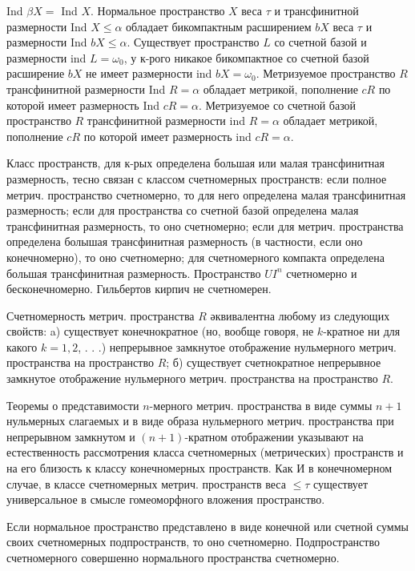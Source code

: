 \documentclass[10pt]{article}
\begin{document}
Ind $\beta X=$ Ind $X$. Нормальное пространство $X$ веса $\tau$ и трансфинитной размерности Ind $X \leqslant \alpha$ обладает бикомпактным расширением $b X$ веса $\tau$ и размерности Ind $b X \leqslant \alpha$. Существует пространство $L$ со счетной базой и размерности ind $L=\omega_{0}$, у к-рого никакое бикомпактное со счетной базой расширение $b X$ не имеет размерности ind $b X=\omega_{0}$. Метризуемое пространство $R$ трансфинитной размерности Ind $R=\alpha$ обладает метрикой, пополнение $c R$ по которой имеет размерность Ind $c R=\alpha$. Метризуемое со счетной базой пространство $R$ трансфинитной размерности ind $R=\alpha$ обладает метрикой, пополнение $c R$ по которой имеет размерность ind $c R=\alpha$.



Класс пространств, для к-рых определена большая или малая трансфинитная размерность, тесно связан с классом счетномерных пространств: если полное метрич. пространство счетномерно, то для него определена малая трансфинитная размерность; если для пространства со счетной базой определена малая трансфинитная размерность, то оно счетномерно; если для метрич. пространства определена болышая трансфинитная размерность (в частности, если оно конечномерно), то оно счетномерно; для счетномерного компакта определена большая трансфинитная размерность. Пространство $U I^{n}$ счетномерно и бесконечномерно. Гильбертов кирпич не счетномерен.



Счетномерность метрич. пространства $R$ әквивалентна любому из следующих свойств: a) существует конечнократное (но, вообще говоря, не $k$-кратное ни для какого $k=1,2$, . . .) непрерывное замкнутое отображение нульмерного метрич. пространства на пространство $R$; б) существует счетнократное непрерывное замкнутое отображение нульмерного метрич. пространства на пространство $R$.



Теоремы о представимости $n$-мерного метрич. пространства в виде суммы $n+1$ нульмерных слагаемых и в виде образа нульмерного метрич. пространства при непрерывном замкнутом и $(n+1)$-кратном отображении указывают на естественность рассмотрения класса счетномерных (метрических) пространств и на его близость к классу конечномерных пространств. Как И в конечномерном случае, в классе счетномерных метрич. пространств веса $\leqslant \tau$ существует универсальное в смысле гомеоморфного вложения пространство.



Если нормальное пространство представлено в виде конечной или счетной суммы своих счетномерных подпространств, то оно счетномерно. Подпространство счетномерного совершенно нормального пространства счетномерно.
\end{document}
